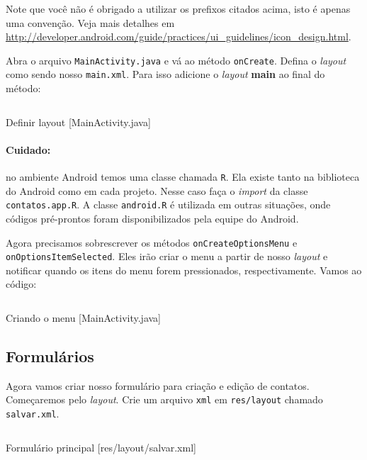 Note que você não é obrigado a utilizar os prefixos citados acima, isto é apenas uma convenção.
Veja mais detalhes em \url{http://developer.android.com/guide/practices/ui_guidelines/icon_design.html}.

Abra o arquivo \texttt{MainActivity.java} e vá ao método \texttt{onCreate}. Defina o \textit{layout} como
sendo nosso \texttt{main.xml}. Para isso adicione o \textit{layout} \textbf{main} ao final do método:

\begin{listing}[H]
  \inputminted[linenos=true,frame=bottomline,tabsize=3]{ java }{ source/MainActivity-1.java }
  \caption{Definir layout [MainActivity.java]}
\end{listing}

\paragraph{Cuidado:} no ambiente Android temos uma classe chamada \texttt{R}. Ela existe tanto
na biblioteca do Android como em cada projeto. Nesse caso faça o \textit{import} da classe
\texttt{contatos.app.R}. A classe \texttt{android.R} é utilizada em outras situações, onde códigos
pré-prontos foram disponibilizados pela equipe do Android.

Agora precisamos sobrescrever os métodos \texttt{onCreateOptionsMenu} e \texttt{onOptionsItemSelected}.
Eles irão criar o menu a partir de nosso \textit{layout} e notificar quando os itens do menu forem
pressionados, respectivamente. Vamos ao código:

\begin{listing}[H]
  \inputminted[linenos=true,frame=bottomline,tabsize=3]{ java }{ source/MainActivity-2.java }
  \caption{Criando o menu [MainActivity.java]}
\end{listing}

\subsection{Formulários}

Agora vamos criar nosso formulário para criação e edição de contatos. Começaremos pelo \textit{layout}.
Crie um arquivo \texttt{xml} em \texttt{res/layout} chamado \texttt{salvar.xml}.

\begin{listing}[H]
  \inputminted[linenos=true,frame=bottomline,tabsize=3]{ xml }{ source/salvar-1.xml }
  \caption{Formulário principal [res/layout/salvar.xml]}
\end{listing}

